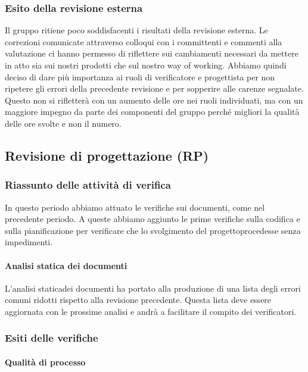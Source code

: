 \subsubsection{Esito della revisione esterna}
Il gruppo ritiene poco soddisfacenti i risultati della revisione esterna. 
Le correzioni comunicate attraverso colloqui con i committenti e commenti alla valutazione ci hanno permesso di riflettere sui cambiamenti necessari da mettere in atto sia sui nostri prodotti che sul nostro way of working\glo.
Abbiamo quindi deciso di dare più importanza ai ruoli di verificatore e progettista per non ripetere gli errori della precedente revisione e per sopperire alle carenze segnalate.
Questo non si rifletterà con un aumento delle ore nei ruoli individuati, ma con un maggiore impegno da parte dei componenti del gruppo perché migliori la qualità delle ore svolte e non il numero.

\subsection{Revisione di progettazione (RP)}
\subsubsection{Riassunto delle attività di verifica}
In questo periodo abbiamo attuato le verifiche sui documenti, come nel precedente periodo. A queste abbiamo aggiunto le prime verifiche sulla codifica e sulla pianificazione per verificare che lo svolgimento del progetto\glosp procedesse senza impedimenti.  
\paragraph{Analisi statica dei documenti}
L'analisi statica\glosp dei documenti ha portato alla produzione di una lista degli errori comuni ridotti rispetto alla revisione precedente. Questa lista deve essere aggiornata con le prossime analisi e andrà a facilitare il compito dei verificatori.
\subsubsection{Esiti delle verifiche}
\paragraph{Qualità di processo}
